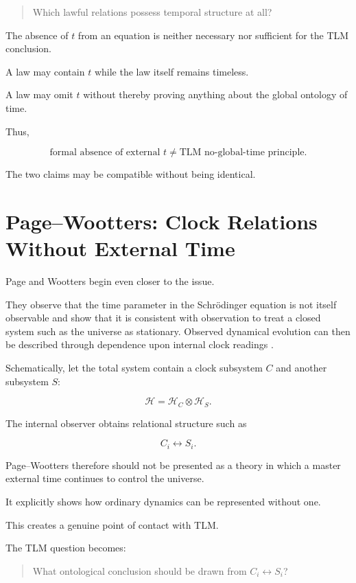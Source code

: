 \documentclass[12pt,onecolumn]{article}
\theoremstyle{plain}
\theoremstyle{definition}
\theoremstyle{remark}
\begin{document}
\begin{quote}
Which lawful relations possess temporal structure at all?
\end{quote}

The absence of \(t\) from an equation is neither necessary nor sufficient
for the TLM conclusion.

A law may contain \(t\) while the law itself remains timeless.

A law may omit \(t\) without thereby proving anything about the global
ontology of time.

Thus,

\[
\boxed{
\text{formal absence of external }t
\neq
\text{TLM no-global-time principle}.
}
\]

The two claims may be compatible without being identical.


\section{Page--Wootters: Clock Relations Without External Time}

Page and Wootters begin even closer to the issue.

They observe that the time parameter in the Schr\"odinger equation is not
itself observable and show that it is consistent with observation to treat
a closed system such as the universe as stationary. Observed dynamical
evolution can then be described through dependence upon internal clock
readings \cite{pagewootters1983}.

Schematically, let the total system contain a clock subsystem \(C\) and
another subsystem \(S\):

\[
\mathcal H
=
\mathcal H_C\otimes\mathcal H_S.
\]

The internal observer obtains relational structure such as

\[
C_i\leftrightarrow S_i.
\]

Page--Wootters therefore should not be presented as a theory in which a
master external time continues to control the universe.

It explicitly shows how ordinary dynamics can be represented without one.

This creates a genuine point of contact with TLM.

The TLM question becomes:

\begin{quote}
What ontological conclusion should be drawn from
\(C_i\leftrightarrow S_i\)?
\end{quote}
\end{document}
